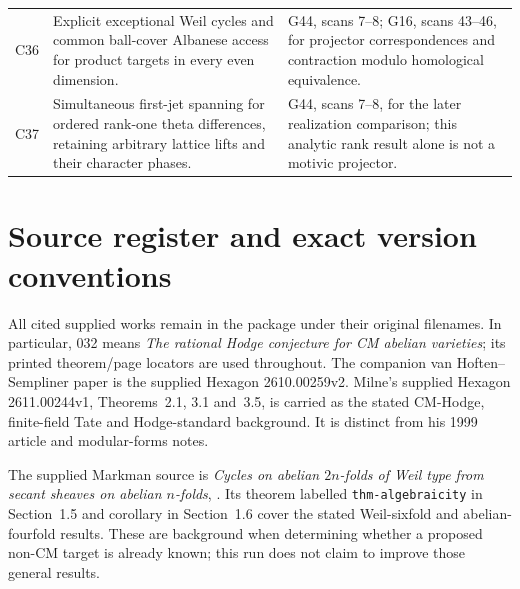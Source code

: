 \documentclass[11pt]{article}
\theoremstyle{definition}\newtheorem{definition}[theorem]{Definition}\newtheorem{remark}[theorem]{Remark}
\begin{document}
\begin{longtable}{@{}p{.18\linewidth}p{.48\linewidth}p{.27\linewidth}@{}}
C36 & Explicit exceptional Weil cycles and common ball-cover Albanese access for product targets in every even dimension. & G44, scans 7--8; G16, scans 43--46, for projector correspondences and contraction modulo homological equivalence.\\
C37 & Simultaneous first-jet spanning for ordered rank-one theta differences, retaining arbitrary lattice lifts and their character phases. & G44, scans 7--8, for the later realization comparison; this analytic rank result alone is not a motivic projector.\\
\bottomrule
\end{longtable}

\section{Source register and exact version conventions}

All cited supplied works remain in the package under their original
filenames. In particular, 032 means
\emph{The rational Hodge conjecture for CM abelian varieties}; its
printed theorem/page locators are used throughout. The companion
van Hoften--Sempliner paper is the supplied Hexagon 2610.00259v2.
Milne's supplied Hexagon 2611.00244v1, Theorems~2.1, 3.1 and~3.5,
is carried as the stated CM-Hodge, finite-field Tate and Hodge-standard
background. It is distinct from his 1999 article and modular-forms notes.

The supplied Markman source is \emph{Cycles on abelian $2n$-folds of
Weil type from secant sheaves on abelian $n$-folds},
.
Its theorem labelled \texttt{thm-algebraicity} in Section~1.5 and
corollary in Section~1.6 cover the stated Weil-sixfold and
abelian-fourfold results. These are background when determining
whether a proposed non-CM target is already known; this run does
not claim to improve those general results.
\end{document}
